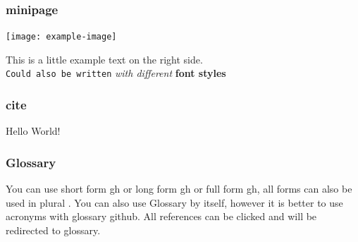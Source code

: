 \subsubsection{minipage}
\begin{minipage}{0.5\linewidth}
    \begin{center}
        \texttt{[image: example-image]}
        \vspace{-8pt}
    \end{center}
\end{minipage}
\begin{minipage}{0.45\linewidth}
    This is a little example text on the right side.\\
    \texttt{Could also be written} \textit{with different} \textbf{font styles}
\end{minipage}

\subsubsection{cite}
Hello World!\cite{martinez-github}

\subsubsection{Glossary}
You can use short form \acrshort{gh} or long form \acrlong{gh} or full form \acrfull{gh}, all forms can also be used in plural .
You can also use Glossary by itself, however it is better to use acronyms with glossary \Gls{github}.
All references can be clicked and will be redirected to glossary.